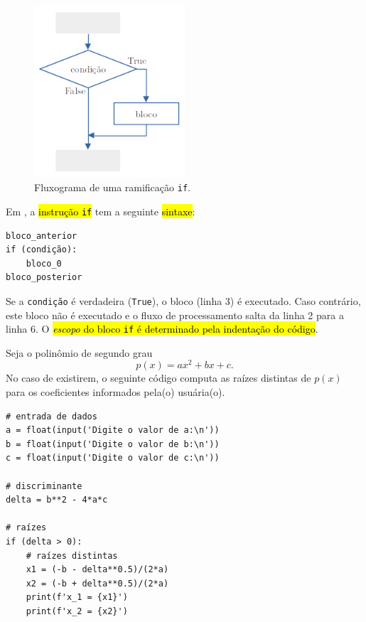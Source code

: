 \begin{figure}[H]
  \centering
  \includegraphics[width=0.5\textwidth]{./cap_progest/dados/fig_fg_if/fig}
  \caption{Fluxograma de uma ramificação \lstinline+if+.}
  \label{cap_progest_sec_ramifica:fig:fg_if}
\end{figure}

Em {\python}, a \hl{instrução {\lstinline+if+}} tem a seguinte \hl{sintaxe}:
\begin{lstlisting}
bloco_anterior
if (condição):
    bloco_0
bloco_posterior
\end{lstlisting}
Se a {\lstinline+condição+} é verdadeira ({\lstinline+True+}), o bloco (linha 3) é executado. Caso contrário, este bloco não é executado e o fluxo de processamento salta da linha 2 para a linha 6. O \hl{\emph{escopo} do bloco {\lstinline+if+} é determinado pela indentação do código}.

\begin{ex}\label{cap_progest_sec_ramifica:ex:bhaskara_if}
  Seja o polinômio de segundo grau
  \begin{equation}
    p(x) = ax^2 + bx + c.
  \end{equation}
  No caso de existirem, o seguinte código computa as raízes distintas de $p(x)$ para os coeficientes informados pela(o) usuária(o).
\begin{lstlisting}
# entrada de dados
a = float(input('Digite o valor de a:\n'))
b = float(input('Digite o valor de b:\n'))
c = float(input('Digite o valor de c:\n'))

# discriminante
delta = b**2 - 4*a*c

# raízes
if (delta > 0):
    # raízes distintas
    x1 = (-b - delta**0.5)/(2*a)
    x2 = (-b + delta**0.5)/(2*a)
    print(f'x_1 = {x1}')
    print(f'x_2 = {x2}')
\end{lstlisting}
\end{ex}

